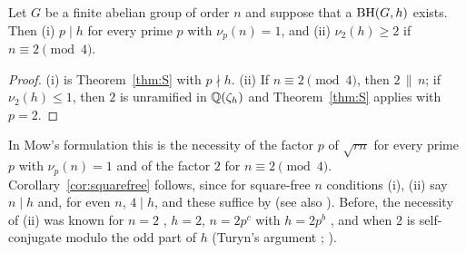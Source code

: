 \begin{corollary}\label{cor:doduc}
Let $G$ be a finite abelian group of order $n$ and suppose that a
$\operatorname{BH}(G,h)$ exists. Then
\textup{(i)} $p\mid h$ for every prime $p$ with $\nu_p(n)=1$, and
\textup{(ii)} $\nu_2(h)\ge2$ if $n\equiv2\pmod4$.
\end{corollary}

\begin{proof}
(i) is Theorem~\ref{thm:S} with $p\nmid h$. (ii) If $n\equiv2\pmod4$, then
$2\,\|\,n$; if $\nu_2(h)\le1$, then $2$ is unramified in $\mathbb{Q}(\zeta_h)$ and
Theorem~\ref{thm:S} applies with $p=2$.
\end{proof}

In Mow's formulation this is the necessity of the factor $p$ of
$\sqrt{rn}$ for every prime $p$ with $\nu_p(n)=1$ and of the factor $2$
for $n\equiv2\pmod4$. Corollary~\ref{cor:squarefree} follows, since for
square-free $n$ conditions (i), (ii) say $n\mid h$ and, for even $n$,
$4\mid h$, and these suffice by \cite[Cor.~2.5]{DucSchmidt2019} (see also
\cite[Result~4.1]{DoDuc2019}). Before, the
necessity of (ii) was known for $n=2$ \cite[Thm.~3.6]{DucSchmidt2019},
$h=2$, $n=2p^c$ with $h=2p^b$ \cite[Cor.~3.12]{DoDuc2019}, and when $2$
is self-conjugate modulo the odd part of $h$ (Turyn's argument
\cite{Turyn1965}; \cite[Prop.~6]{KumarScholtzWelch1985}).

